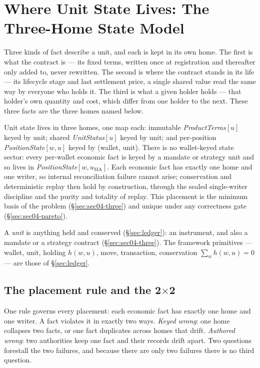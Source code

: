 \section{Where Unit State Lives: The Three-Home State Model}
\label{sec:sec04}
\label{sec:states}

Three kinds of fact describe a unit, and each is kept in its own home. The first is what
the contract is --- its fixed terms, written once at registration and thereafter only added
to, never rewritten. The second is where the contract stands in its life --- its lifecycle
stage and last settlement price, a single shared value read the same way by everyone who
holds it. The third is what a given holder holds --- that holder's own quantity and cost,
which differ from one holder to the next. These three facts are the three homes named
below.

Unit state lives in three homes, one map each: immutable \emph{ProductTerms}$[u]$
keyed by unit; shared \emph{UnitStatus}$[u]$ keyed by unit; and per-position
\emph{PositionState}$[w,u]$ keyed by (wallet, unit). There is no wallet-keyed state
sector: every per-wallet economic fact is keyed by a mandate or strategy unit and so
lives in \emph{PositionState}$[w,u_{\mathrm{MA}}]$. Each economic fact has exactly one
home and one writer, so internal reconciliation failure cannot arise; conservation and
deterministic replay then hold by construction, through the sealed single-writer
discipline and the purity and totality of replay. This placement is the minimum basis of
the problem (\S\ref{sec:sec04-three}) and unique under any correctness gate
(\S\ref{sec:sec04-pareto}).

A \emph{unit} is anything held and conserved (\S\ref{sec:ledger}): an instrument, and
also a mandate or a strategy contract (\S\ref{sec:sec04-three}). The framework
primitives --- wallet, unit, holding $h(w,u)$, move, transaction, conservation
$\sum_{w}h(w,u)=0$ --- are those of \S\ref{sec:ledger}.

\subsection{The placement rule and the 2\texorpdfstring{$\times$}{x}2}
\label{sec:sec04-rule}

One rule governs every placement: each economic fact has exactly one home and one
writer. A fact violates it in exactly two ways. \emph{Keyed wrong}: one home collapses
two facts, or one fact duplicates across homes that drift. \emph{Authored wrong}: two
authorities keep one fact and their records drift apart. Two questions forestall the two
failures, and because there are only two failures there is no third question.

